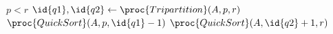 \begin{codebox}
    \li \If $p < r$
    \li 	\Then
                $\id{q1},\id{q2} \gets \proc{Tripartition}(A,p,r)$
    \li 		$\proc{QuickSort}(A,p,\id{q1}-1)$
    \li 		$\proc{QuickSort}(A,\id{q2}+1,r)$
            \End
\end{codebox} 